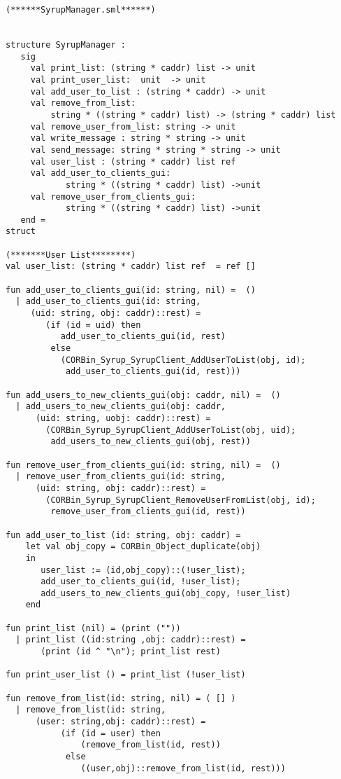 \begin{verbatim}
(******SyrupManager.sml******)


structure SyrupManager :
   sig 
     val print_list: (string * caddr) list -> unit
     val print_user_list:  unit  -> unit
     val add_user_to_list : (string * caddr) -> unit
     val remove_from_list: 
         string * ((string * caddr) list) -> (string * caddr) list
     val remove_user_from_list: string -> unit
     val write_message : string * string -> unit
     val send_message: string * string * string -> unit
     val user_list : (string * caddr) list ref
     val add_user_to_clients_gui: 
            string * ((string * caddr) list) ->unit 
     val remove_user_from_clients_gui: 
            string * ((string * caddr) list) ->unit 
   end = 
struct

(*******User List********)
val user_list: (string * caddr) list ref  = ref [] 

fun add_user_to_clients_gui(id: string, nil) =  ()
  | add_user_to_clients_gui(id: string, 
     (uid: string, obj: caddr)::rest) = 
        (if (id = uid) then 
           add_user_to_clients_gui(id, rest)
         else 
           (CORBin_Syrup_SyrupClient_AddUserToList(obj, id);
            add_user_to_clients_gui(id, rest)))

fun add_users_to_new_clients_gui(obj: caddr, nil) =  ()
  | add_users_to_new_clients_gui(obj: caddr,
      (uid: string, uobj: caddr)::rest) = 
        (CORBin_Syrup_SyrupClient_AddUserToList(obj, uid);
         add_users_to_new_clients_gui(obj, rest))

fun remove_user_from_clients_gui(id: string, nil) =  ()
  | remove_user_from_clients_gui(id: string, 
      (uid: string, obj: caddr)::rest) = 
        (CORBin_Syrup_SyrupClient_RemoveUserFromList(obj, id);
         remove_user_from_clients_gui(id, rest))

fun add_user_to_list (id: string, obj: caddr) = 
    let val obj_copy = CORBin_Object_duplicate(obj)
    in
       user_list := (id,obj_copy)::(!user_list);
       add_user_to_clients_gui(id, !user_list);
       add_users_to_new_clients_gui(obj_copy, !user_list)
    end 

fun print_list (nil) = (print (""))
  | print_list ((id:string ,obj: caddr)::rest) = 
       (print (id ^ "\n"); print_list rest)

fun print_user_list () = print_list (!user_list) 

fun remove_from_list(id: string, nil) = ( [] )
  | remove_from_list(id: string, 
      (user: string,obj: caddr)::rest) = 
           (if (id = user) then 
               (remove_from_list(id, rest))
            else 
               ((user,obj)::remove_from_list(id, rest)))


\end{verbatim}
